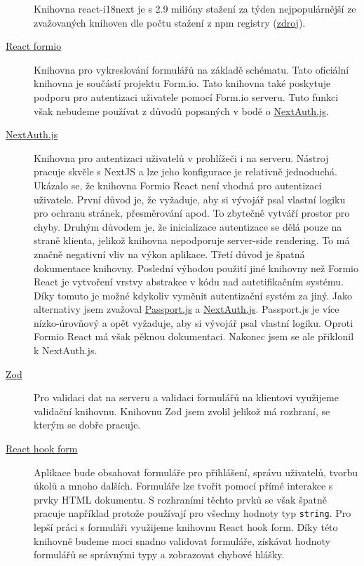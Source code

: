 \begin{description}
    Knihovna react-i18next je s 2.9 milióny stažení za týden nejpopulárnější ze zvažovaných knihoven dle počtu stažení z npm registry (\href{https://www.npmjs.com/package/react-i18next}{zdroj}).
    \item[\href{https://github.com/formio/react}{React formio}]
    Knihovna pro vykreslování formulářů na základě schématu.
    Tato oficiální knihovna je součástí projektu Form.io.
    Tato knihovna také poskytuje podporu pro autentizaci uživatele pomocí Form.io serveru.
    Tuto funkci však nebudeme používat z důvodů popsaných v bodě o \href{itm:next-auth}{NextAuth.js}.
    \item[\href{https://next-auth.js.org/}{NextAuth.js}]\label{itm:next-auth}
    Knihovna pro autentizaci uživatelů v prohlížeči i na serveru.
    Nástroj pracuje skvěle s NextJS a lze jeho konfigurace je relativně jednoduchá.
    Ukázalo se, že knihovna Formio React není vhodná pro autentizaci uživatele.
    První důvod je, že vyžaduje, aby si vývojář psal vlastní logiku pro ochranu stránek, přesměrování apod.
    To zbytečně vytváří prostor pro chyby.
    Druhým důvodem je, že inicializace autentizace se dělá pouze na straně klienta, jelikož knihovna nepodporuje server-side rendering.
    To má značně negativní vliv na výkon aplikace.
    Třetí důvod je špatná dokumentace knihovny.
    Poslední výhodou použití jiné knihovny než Formio React je vytvoření vrstvy abstrakce v kódu nad autetifikačním systému.
    Díky tomuto je možné kdykoliv vyměnit autentizační systém za jiný.
    Jako alternativy jsem zvažoval \href{https://www.passportjs.org/}{Passport.js} a \href{https://next-auth.js.org/}{NextAuth.js}.
    Passport.js je více nízko-úrovňový a opět vyžaduje, aby si vývojář psal vlastní logiku.
    Oproti Formio React má však pěknou dokumentaci.
    Nakonec jsem se ale přiklonil k NextAuth.js.
    \item[\href{https://zod.dev/}{Zod}]
    Pro validaci dat na serveru a validaci formulářů na klientovi využijeme validační knihovnu.
    Knihovnu Zod jsem zvolil jelikož má rozhraní, se kterým se dobře pracuje.
    \item[\href{https://react-hook-form.com/}{React hook form}]
    Aplikace bude obsahovat formuláře pro přihlášení, správu uživatelů, tvorbu úkolů a mnoho dalších.
    Formuláře lze tvořit pomocí přímé interakce s prvky HTML dokumentu.
    S rozhraními těchto prvků se však špatně pracuje například protože používají pro všechny hodnoty typ \texttt{string}.
    Pro lepší práci s formuláři využijeme knihovnu React hook form.
    Díky této knihovně budeme moci snadno validovat formuláře, získávat hodnoty formulářů se správnými typy a zobrazovat chybové hlášky.

\end{description}
